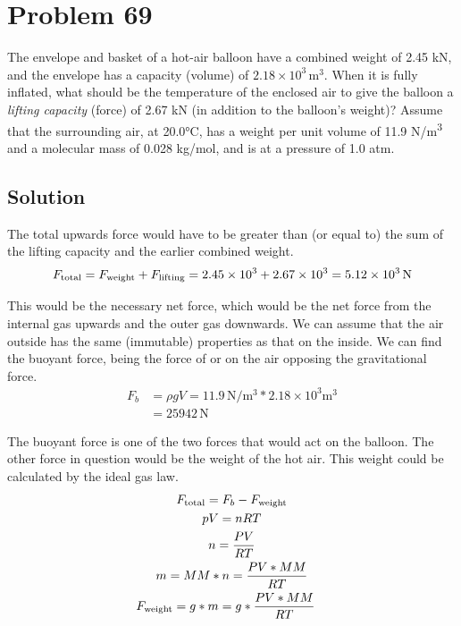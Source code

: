 \documentclass[12pt]{article}
\newcommand{\E}[1]{\times 10^{#1}}
\begin{document}
    \pagebreak
    \section{Problem 69}
        The envelope and basket of a hot-air balloon have a combined weight of 2.45 kN, and the envelope has a capacity (volume) of $2.18\E{3}\,\unit{\meter^3}$. 
        When it is fully inflated, what should be the temperature of the enclosed air to give the balloon a \textit{lifting capacity} (force) of 2.67 kN (in addition to the balloon's weight)?
        Assume that the surrounding air, at 20.0°C, has a weight per unit volume of 11.9 \unit{\newton/\meter^3} and a molecular mass of 0.028 kg/mol, and is at a pressure of 1.0 atm.

        \subsection{Solution}
            The total upwards force would have to be greater than (or equal to) the sum of the lifting capacity and the earlier combined weight.
            \begin{equation}
                F_{\rm total}   =   F_{\rm weight} + F_{\rm lifting}
                    =   2.45\E{3} + 2.67\E{3}
                    =   5.12\E{3}\,\unit{\newton}
            \end{equation}

            This would be the necessary net force, which would be the net force from the internal gas upwards and the outer gas downwards.
            We can assume that the air outside has the same (immutable) properties as that on the inside.
            We can find the buoyant force, being the force of or on the air opposing the gravitational force.
            \begin{align}
                F_b &=  \rho g V
                    =   11.9\,\unit{\newton/\meter^3} * 2.18\E{3} \unit{\meter^3}\\
                    &=  25942\,\unit{\newton}
            \end{align}

            The buoyant force is one of the two forces that would act on the balloon. 
            The other force in question would be the weight of the hot air.
            This weight could be calculated by the ideal gas law.
            \begin{gather}
                F_{\rm total}   =   F_b - F_{\rm weight}\\
                pV  =   nRT\\
                n   =   \frac{PV}{RT}\\
                m   =   MM * n = \frac{PV * MM}{RT}\\
                \begin{align}
                    F_{\rm weight}  &=  g * m
                        =   g * \frac{PV * MM}{RT}
                \end{align}
            \end{gather}
\end{document}

